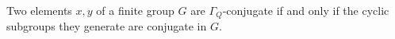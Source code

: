 Two elements $x, y$ of a finite group $G$ are $\Gamma_Q$-conjugate if and only if the cyclic subgroups they generate are conjugate in $G$.

